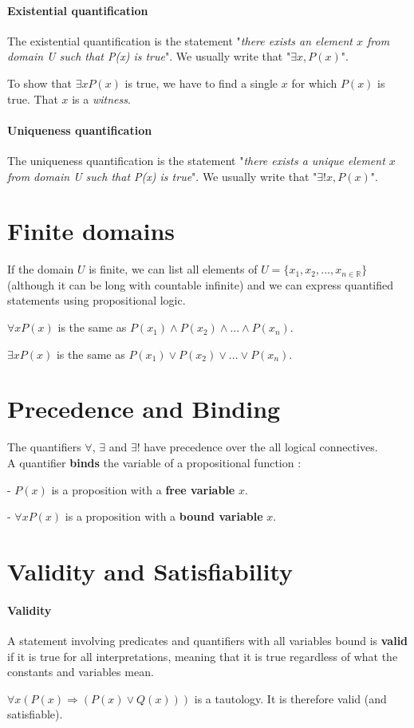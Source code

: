 \documentclass[10pt,a4paper]{book}
\newcommand{\R}{\mathbb{R}}
\begin{document}
\paragraph*{Existential quantification}
The existential quantification is the statement "\textit{there exists an element $x$ from domain U such that P(x) is true}". We usually write that "$\exists x, P(x)$".\par 
To show that $\exists xP(x)$ is true, we have to find a single $x$ for which $P(x)$ is true. That $x$ is a \textit{witness}.
\paragraph*{Uniqueness quantification}
The uniqueness quantification is the statement "\textit{there exists a unique element $x$ from domain U such that P(x) is true}". We usually write that "$\exists! x, P(x)$".
\section{Finite domains}
If the domain $U$ is finite, we can list all elements of $U=\{x_1,x_2,...,x_{n\in\R}\}$ (although it can be long with countable infinite) and we can express quantified statements using propositional logic.\par 
$\forall xP(x)$ is the same as $P(x_1)\land P(x_2)\land ...\land P(x_n)$.\par 
$\exists xP(x)$ is the same as $P(x_1)\lor P(x_2)\lor ...\lor P(x_n)$.
\section{Precedence and Binding}
The quantifiers $\forall$, $\exists$ and $\exists!$ have precedence over the all logical connectives. \\ 
A quantifier \textbf{binds} the variable of a propositional function :\par 
- $P(x)$ is a proposition with a \textbf{free variable} $x$.\par
- $\forall xP(x)$ is a proposition with a \textbf{bound variable} $x$.
\section{Validity and Satisfiability}
\paragraph*{Validity}
A statement involving predicates and quantifiers with all variables bound is \textbf{valid} if it is true for all interpretations, meaning that it is true regardless of what the constants and variables mean.\par 
$\forall x(P(x)\Rightarrow (P(x)\lor Q(x)))$ is a tautology. It is therefore valid (and satisfiable).
\end{document}
